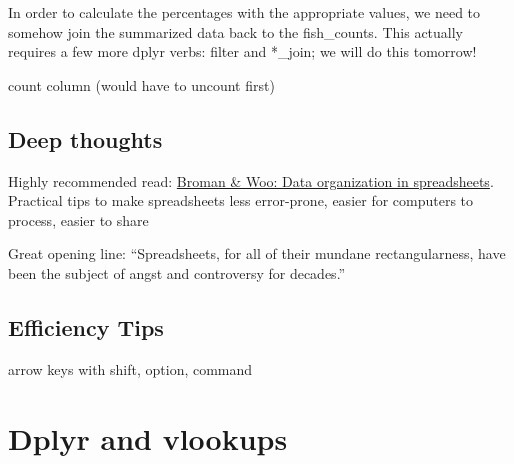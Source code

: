 \documentclass[]{book}
\newenvironment{Shaded}{\begin{snugshade}}{\end{snugshade}}
\newcommand{\CommentTok}[1]{\textcolor[rgb]{0.56,0.35,0.01}{\textit{#1}}}
\newcommand{\DataTypeTok}[1]{\textcolor[rgb]{0.13,0.29,0.53}{#1}}
\newcommand{\DecValTok}[1]{\textcolor[rgb]{0.00,0.00,0.81}{#1}}
\newcommand{\KeywordTok}[1]{\textcolor[rgb]{0.13,0.29,0.53}{\textbf{#1}}}
\newcommand{\NormalTok}[1]{#1}
\newcommand{\OperatorTok}[1]{\textcolor[rgb]{0.81,0.36,0.00}{\textbf{#1}}}
\newcommand{\StringTok}[1]{\textcolor[rgb]{0.31,0.60,0.02}{#1}}
\begin{document}
\begin{Shaded}
\end{Shaded}

In order to calculate the percentages with the appropriate values, we need to somehow join the summarized data back to the fish\_counts. This actually requires a few more dplyr verbs: filter and *\_join; we will do this tomorrow!

count column (would have to uncount first)

\hypertarget{deep-thoughts-1}{%
\section{Deep thoughts}\label{deep-thoughts-1}}

Highly recommended read: \href{https://peerj.com/preprints/3183/}{Broman \& Woo: Data organization in spreadsheets}. Practical tips to make spreadsheets less error-prone, easier for computers to process, easier to share

Great opening line: ``Spreadsheets, for all of their mundane rectangularness, have been the subject of angst and controversy for decades.''

\hypertarget{efficiency-tips-5}{%
\section{Efficiency Tips}\label{efficiency-tips-5}}

arrow keys with shift, option, command

\hypertarget{vlookup}{%
\chapter{Dplyr and vlookups}\label{vlookup}}
\end{document}
